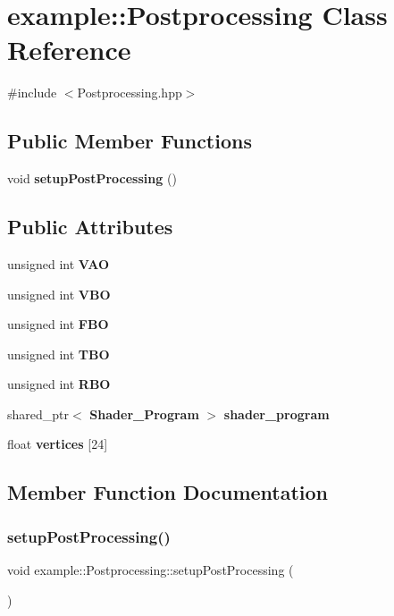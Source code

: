 \section{example\+::Postprocessing Class Reference}
\label{classexample_1_1_postprocessing}


{\ttfamily \#include $<$Postprocessing.\+hpp$>$}

\subsection*{Public Member Functions}
\begin{DoxyCompactItemize}
\item 
void \textbf{ setup\+Post\+Processing} ()
\end{DoxyCompactItemize}
\subsection*{Public Attributes}
\begin{DoxyCompactItemize}
\item 
unsigned int \textbf{ V\+AO}
\item 
unsigned int \textbf{ V\+BO}
\item 
unsigned int \textbf{ F\+BO}
\item 
unsigned int \textbf{ T\+BO}
\item 
unsigned int \textbf{ R\+BO}
\item 
shared\+\_\+ptr$<$ \textbf{ Shader\+\_\+\+Program} $>$ \textbf{ shader\+\_\+program}
\item 
float \textbf{ vertices} [24]
\end{DoxyCompactItemize}


\subsection{Member Function Documentation}
\mbox{\label{classexample_1_1_postprocessing_aed1bc27008c7e2b391db61758011a7c2}} 
\subsubsection{setupPostProcessing()}
{\footnotesize\ttfamily void example\+::\+Postprocessing\+::setup\+Post\+Processing (\begin{DoxyParamCaption}{ }\end{DoxyParamCaption})\hspace{0.3cm}{\ttfamily [inline]}}



